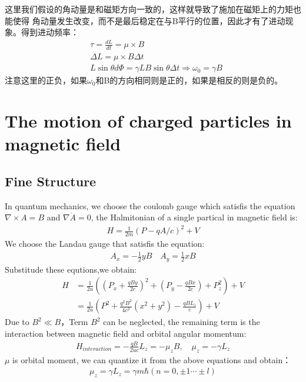 \documentclass[UTF8]{article}
\numberwithin{equation}{section}
\begin{document}
这里我们假设的角动量是和磁矩方向一致的，这样就导致了施加在磁矩上的力矩也能使得
角动量发生改变，而不是最后稳定在与B平行的位置，因此才有了进动现象。得到进动频率：
\begin{align*}
     & \tau =\frac{dL}{dt}=\mu \times B                                                     \\
     & \Delta L = \mu \times B \Delta t                                                     \\
     & L\sin \theta d\varPhi = \gamma L B \sin\theta \Delta t\Rightarrow\omega_0 = \gamma B
\end{align*}
注意这里的正负，如果$\omega_0$和B的方向相同则是正的，如果是相反的则是负的。
\section{The motion of charged particles in magnetic field}
\subsection{Fine Structure}
In quantum mechanics, 
we choose the coulomb gauge which satisfis the equation 
$\nabla \times A = B$ and $\nabla \dot A =0$, the Halmitonian of a 
single partical in magnetic field is:
\begin{align*}
    H=\frac{1}{2m}(P-qA/c)^2+V
\end{align*}
We choose the Landau gauge that satisfis the equation:
\begin{align*}
    A_x = -\frac{1}{2} yB\quad A_y = \frac{1}{2} xB
\end{align*}
Substitude these equtions,we obtain:
\begin{align*}
    H &= \frac{1}{2u}((P_x+\frac{qBy}{2c})^2+(P_y-\frac{qBx}{2c})+P_z^2)+V\\
    &= \frac{1}{2u}(P^2+\frac{q^2B^2}{4c^2}(x^2+y^2)-\frac{qBL_z}{c})+V
\end{align*}
Due to $B^2 \ll B$，Term $B^2$ can be neglected, the remaining term is
the interaction between magnetic field and orbital angular momentum:
\begin{align*}
    H_{interaction} = -\frac{qB}{2uc}L_z = -\mu_z B,\quad \mu_z = -\gamma L_z
\end{align*}
$\mu$ is orbital moment, we can quantize it from the above equations and obtain：
\begin{align*}
    \mu_z = \gamma L_z=\gamma m\hbar(n=0,\pm 1\cdots \pm l)
\end{align*}
\end{document}
